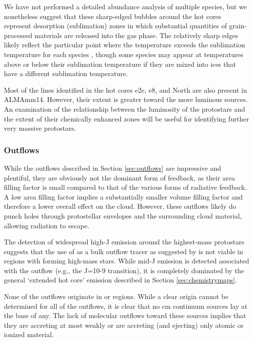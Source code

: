 \documentclass{emulateapj}
\begin{document}
We have not performed a detailed abundance analysis of multiple species, but we
nonetheless suggest that these sharp-edged bubbles around the hot cores
represent desorption (sublimation) zones in which substantial quantities of
grain-processed materials are released into the gas phase.  The relatively
sharp edges likely reflect the particular point where the temperature exceeds
the sublimation temperature for each species \citep{Garrod2006a,Green2009a},
though some species may appear at temperatures above or below their sublimation
temperature if they are mixed into ices that have a different sublimation
temperature.

Most of the lines identified in the hot cores e2e, e8, and North are also
present in ALMAmm14.  However, their extent is greater toward the more luminous
sources.  An examination of the relationship between the luminosity of the
protostars and the extent of their chemically enhanced zones will be useful for
identifying further very massive protostars.


\subsubsection{Outflows}
\label{sec:outflowdiscussion}
While the outflows described in Section \ref{sec:outflows} are impressive and
plentiful, they are obviously not the dominant form of feedback, as their area
filling factor is small compared to that of the various forms of radiative
feedback.  A low area filling factor implies a substantially smaller volume
filling factor and therefore a lower overall effect on the cloud.  However,
these outflows likely do punch holes through protostellar envelopes and the
surrounding cloud material, allowing radiation to escape.

The detection of widespread high-J \methanol emission around the highest-mass
protostars suggests that the use of \methanol as a bulk outflow tracer as
suggested by \citet{Kristensen2015a} is not viable in regions with forming
high-mass stars.  While mid-J \methanol emission is detected associated with
the outflow (e.g., the J=10-9 transition), it is completely dominated by the
general `extended hot core' emission described in Section
\ref{sec:chemistrymaps}.

None of the outflows originate in \uchii or \hchii regions.  While a clear
origin cannot be determined for all of the outflows, it is clear that no cm
continuum sources lay at the base of any.  The lack of molecular outflows
toward these sources implies that they are accreting at most weakly or are
accreting (and ejecting) only atomic or ionized material.
\end{document}
